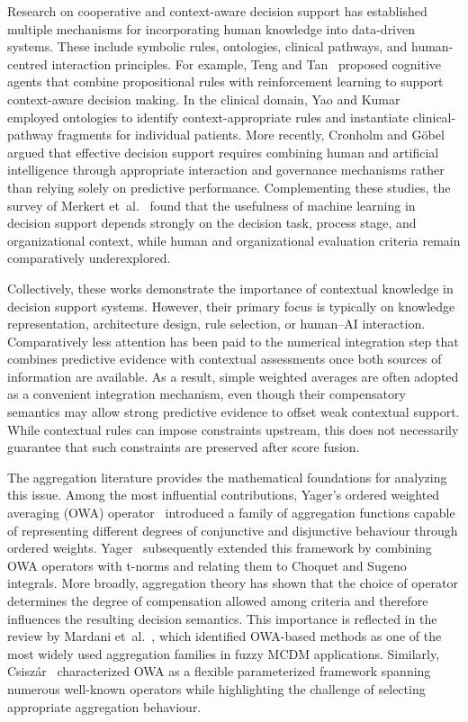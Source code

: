 \documentclass[mathematics,article,submit,moreauthors]{Definitions/mdpi}
\begin{document}
Research on cooperative and context-aware decision support has established
multiple mechanisms for incorporating human knowledge into data-driven
systems. These include symbolic rules, ontologies, clinical pathways,
and human-centred interaction principles. For example, Teng and
Tan~\cite{TengTan2008} proposed cognitive agents that combine
propositional rules with reinforcement learning to support context-aware
decision making. In the clinical domain, Yao and
Kumar~\cite{YaoKumar2012} employed ontologies to identify
context-appropriate rules and instantiate clinical-pathway fragments for
individual patients. More recently, Cronholm and
G\"obel~\cite{CronholmGoebel2022} argued that effective decision support
requires combining human and artificial intelligence through appropriate
interaction and governance mechanisms rather than relying solely on
predictive performance. Complementing these studies, the survey of
Merkert et~al.~\cite{MerkertEtAl2015} found that the usefulness of
machine learning in decision support depends strongly on the decision
task, process stage, and organizational context, while human and
organizational evaluation criteria remain comparatively underexplored.

Collectively, these works demonstrate the importance of contextual
knowledge in decision support systems. However, their primary focus is
typically on knowledge representation, architecture design, rule
selection, or human--AI interaction. Comparatively less attention has
been paid to the numerical integration step that combines predictive
evidence with contextual assessments once both sources of information are
available. As a result, simple weighted averages are often adopted as a
convenient integration mechanism, even though their compensatory
semantics may allow strong predictive evidence to offset weak contextual
support. While contextual rules can impose constraints upstream, this
does not necessarily guarantee that such constraints are preserved after
score fusion.

The aggregation literature provides the mathematical foundations for
analyzing this issue. Among the most influential contributions, Yager's
ordered weighted averaging (OWA) operator~\cite{Yager1988} introduced a
family of aggregation functions capable of representing different
degrees of conjunctive and disjunctive behaviour through ordered
weights. Yager~\cite{Yager2005} subsequently extended this framework by
combining OWA operators with t-norms and relating them to Choquet and
Sugeno integrals. More broadly, aggregation theory has shown that the
choice of operator determines the degree of compensation allowed among
criteria and therefore influences the resulting decision semantics. This
importance is reflected in the review by Mardani
et~al.~\cite{Mardani2018}, which identified OWA-based methods as one of
the most widely used aggregation families in fuzzy MCDM applications.
Similarly, Csisz\'ar~\cite{Csiszar2021} characterized OWA as a flexible
parameterized framework spanning numerous well-known operators while
highlighting the challenge of selecting appropriate aggregation
behaviour.
\end{document}
